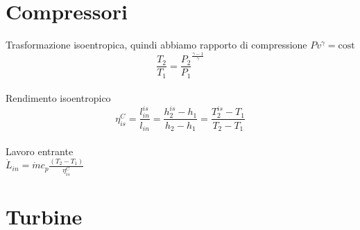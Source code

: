 \documentclass[portrait,a4paper]{article}
\begin{document}
\begin{multicols}{3}
\section{Compressori}
Trasformazione isoentropica, quindi abbiamo rapporto di compressione
\(Pv^\gamma = \text{cost}\) \\
\[\frac{T_2}{T_1}=\frac{P_2}{P_1}^{\frac{\gamma -1}{\gamma}} \] \\
Rendimento isoentropico \\
\[ \eta_{is}^C = \frac{l_{in}^{is}}{l_{in}} = \frac{h_{2}^{is} - h_1}{h_2 - h_1} =  \frac{T_{2}^{is} - T_1}{T_2 - T_1}\] \\
Lavoro entrante \\
\( \dot L_{in} = \dot m c_p \frac{(T_2 - T_1)}{\eta_{is}^C} \)


\section{Turbine}



\end{multicols}
\end{document}

